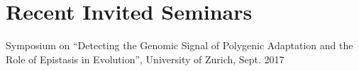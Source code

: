 \documentclass[letterpaper]{article}
\renewenvironment{itemize}{
  \begin{list}{}{
    \setlength{\leftmargin}{1.5em}
  }
}{
  \end{list}
}
\begin{document}
\section*{Recent Invited Seminars}
\begin{itemize}
  \item Symposium on ``Detecting the Genomic Signal of Polygenic Adaptation and the Role of Epistasis in Evolution'', University of Zurich, Sept. 2017

\end{itemize}
\end{document}
